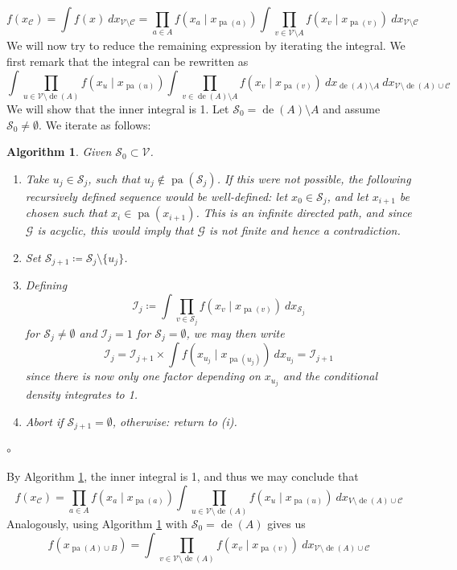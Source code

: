 \documentclass[11pt, a4paper]{memoir}
\theoremstyle{break}
\theoremstyle{break}
\newtheorem{inneralg}{Algorithm}
\newenvironment{alg}{\begin{inneralg}}{\ensuremath{\circ}\end{inneralg}}
\theoremstyle{nonumberplain}
\DeclareMathOperator{\pa}{pa}
\DeclareMathOperator{\de}{de}
\begin{document}
$$f\left(x_{\mathcal{C}}\right)=\int f(x)\ dx_{\mathcal{V}\setminus \mathcal{C}}=\prod_{a\in A}f\left(x_{a}\mid x_{\pa(a)}\right)\int \prod_{v\in \mathcal{V}\setminus A} f\left(x_v\mid x_{\pa(v)}\right)\ dx_{\mathcal{V}\setminus \mathcal{C}}$$
We will now try to reduce the remaining expression by iterating the integral. We first remark that the integral can be rewritten as
$$\int \prod_{u\in \mathcal{V}\setminus \de(A)} f\left(x_u\mid x_{\pa(u)}\right) \int \prod_{v\in \de(A)\setminus A} f\left(x_v\mid x_{\pa(v)}\right)\ dx_{\de(A)\setminus A}\ dx_{\mathcal{V}\setminus \de(A)\cup \mathcal{C}}$$
We will show that the inner integral is 1. Let $\mathcal{S}_0=\de(A)\setminus A$ and assume $\mathcal{S}_0\neq\emptyset$. We iterate as follows:
\begin{alg}\label{alg1}
Given $\mathcal{S}_0\subset \mathcal{V}$.
\begin{enumerate}[label=(\roman*)]
	\item Take $u_j\in \mathcal{S}_j$, such that $u_j\not\in \pa\left(\mathcal{S}_j\right)$. If this were not possible, the following recursively defined sequence would be well-defined: let $x_0\in \mathcal{S}_j$, and let $x_{i+1}$ be chosen such that $x_i\in \pa(x_{i+1})$. This is an infinite directed path, and since $\mathcal{G}$ is acyclic, this would imply that $\mathcal{G}$ is not finite and hence a contradiction.
	\item Set $\mathcal{S}_{j+1}\coloneqq\mathcal{S}_j\setminus \{u_j\}$.  
	\item Defining
$$\mathcal{I}_{j}\coloneqq \int\prod_{v\in \mathcal{S}_j} f\left(x_v\mid x_{\pa(v)}\right)\ dx_{\mathcal{S}_j}$$
for $ \mathcal{S}_j\neq \emptyset$ and $\mathcal{I}_j=1$ for $\mathcal{S}_j= \emptyset$, we may then write
	$$\mathcal{I}_{j}=\mathcal{I}_{j+1}\times \int f\left(x_{u_j}\mid x_{\pa(u_j)}\right)\ dx_{u_j}=\mathcal{I}_{j+1}$$
	since there is now only one factor depending on $x_{u_j}$ and the conditional density integrates to 1.
	\item Abort if $\mathcal{S}_{j+1}=\emptyset$, otherwise: return to (i).
\end{enumerate}
\end{alg}
By Algorithm \ref{alg1}, the inner integral is 1, and thus we may conclude that
$$f(x_{\mathcal{C}})=\prod_{a\in A}f\left(x_a\mid x_{\pa(a)}\right)\int \prod_{u\in \mathcal{V}\setminus \de(A)} f\left(x_u\mid x_{\pa(u)}\right)\ dx_{V\setminus \de(A)\cup \mathcal{C}}$$
Analogously, using Algorithm \ref{alg1} with $\mathcal{S}_0=\de(A)$ gives us
$$
f(x_{\pa(A)\cup B})=\int \prod_{v\in \mathcal{V}\setminus\de(A)} f\left(x_v\mid x_{\pa(v)}\right)\ dx_{\mathcal{V}\setminus \de(A)\cup \mathcal{C}}
$$
\end{document}
